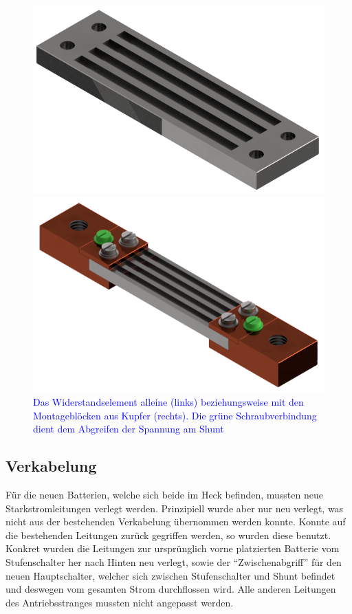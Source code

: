 \begin{figure}[h!]
\begin{minipage}{0.49\textwidth}
\includegraphics[width=\textwidth]{images/Shunt.png}
\end{minipage}\begin{minipage}{0.49\textwidth}
\includegraphics[width=\textwidth]{images/Shunt_komplett.png}
\end{minipage}
\caption{\textcolor{blue}{Das Widerstandselement alleine (links) beziehungsweise mit den Montageblöcken aus Kupfer (rechts). Die grüne Schraubverbindung dient dem Abgreifen der Spannung am Shunt}}%
\label{fig:shunt}%
\end{figure}

\subsection{Verkabelung}
Für die neuen Batterien, welche sich beide im Heck befinden, mussten neue Starkstromleitungen verlegt werden. Prinzipiell wurde aber nur neu verlegt, was nicht aus der bestehenden Verkabelung übernommen werden konnte. Konnte auf die bestehenden Leitungen zurück gegriffen werden, so wurden diese benutzt. Konkret wurden die Leitungen zur ursprünglich vorne platzierten Batterie vom Stufenschalter her nach Hinten neu verlegt, sowie der "`Zwischenabgriff"' für den neuen Hauptschalter, welcher sich zwischen Stufenschalter und Shunt befindet und deswegen vom gesamten Strom durchflossen wird. Alle anderen Leitungen des Antriebsstranges mussten nicht angepasst werden.

